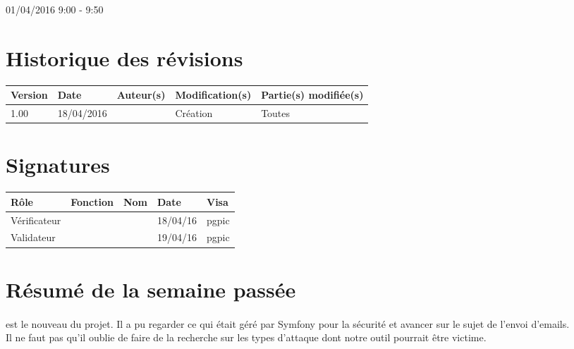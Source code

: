 \documentclass [a4paper] {article}
\begin{document}
01/04/2016			 				%
\hfill   
\hfill 	 9:00 - 9:50 				%


\section*{Historique des révisions}
\begin{center}
			\begin{tabular}{| p{2.5cm} | p{3cm} | p{3cm} | p{3cm} | p{3.5cm} |}
				\hline
				\rowcolor{Gray}
				Version & Date & Auteur(s) & Modification(s) & Partie(s) modifiée(s)		 \\
				\hline
				1.00 & 18/04/2016 & \Pierre & Création & Toutes \\
		\hline		
			\end{tabular}
		\end{center}

\section*{Signatures}

		\begin{center}
			\begin{tabular}{| p{2.5cm} | p{4cm} | p{3cm} | p{3cm} | p{2.5cm} |}
				\hline
				\rowcolor{Gray}
				Rôle & Fonction & Nom & Date & Visa		 \\
				\hline
				Vérificateur & \RQA & \Kafui & 18/04/16 & pgpic \\[30pt]
				\hline
				Validateur & \CP & \Sergi & 19/04/16 & pgpic \\[30pt]	
				\hline
			\end{tabular}
		\end{center}


\section{Résumé de la semaine passée}
\paragraph*{}
\Florian{} est le nouveau \RS{} du projet. Il a pu regarder ce qui était géré par Symfony pour la sécurité et avancer sur le sujet de l'envoi d'emails. \\
Il ne faut pas qu'il oublie de faire de la recherche sur les types d'attaque dont notre outil pourrait être victime.
\end{document}
